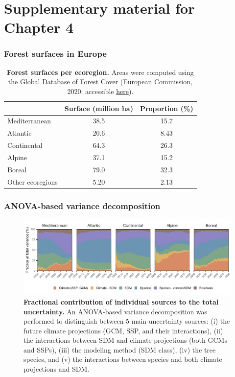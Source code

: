 
\section{Supplementary material for Chapter 4}

\vspace*{1cm}

\subsubsection{Forest surfaces in Europe}

\begin{table}[ht]
\centering
\caption{\textbf{Forest surfaces per ecoregion.} Areas were computed using the Global Database of Forest Cover (European Commission, 2020; accessible \href{http://data.europa.eu/89h/10d1b337-b7d1-4938-a048-686c8185b290}{here}).}
\begin{tabular}[t]{lcc}
\hline
&Surface (million ha) & Proportion (\%)\\
\hline
Mediterranean & 38.5 & 15.7 \\
Atlantic & 20.6 & 8.43 \\
Continental & 64.3 & 26.3 \\
Alpine & 37.1 & 15.2 \\
Boreal & 79.0 & 32.3 \\
Other ecoregions & 5.20 & 2.13 \\
\hline
\end{tabular}
\label{tab:forest}
\end{table}

\subsubsection{ANOVA-based variance decomposition}


\begin{figure}[htpb]
\centering
\includegraphics{chapter4/figs/appendix_frac_uncertainties-1.pdf}
\caption{\textbf{Fractional contribution of individual sources to the total uncertainty.} An ANOVA-based variance decomposition was performed to distinguish between 5 main uncertainty sources: (i) the future climate projections (GCM, SSP, and their interactions), (ii) the interactions between SDM and climate projections (both GCMs and SSPs), (iii) the modeling method (SDM class), (iv) the tree species, and (v) the interactions between species and both climate projections and SDM.}
\label{app:frac}
\end{figure}

